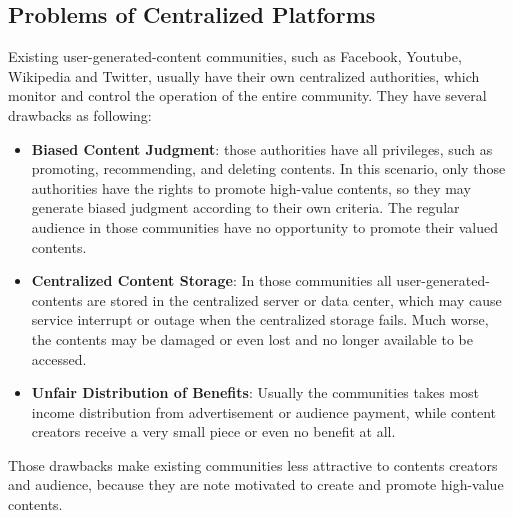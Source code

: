 \subsection{Problems of Centralized Platforms}
Existing user-generated-content communities, such as Facebook, Youtube, Wikipedia and Twitter, usually have their own centralized authorities, which monitor and control the operation of the entire community. They have several drawbacks as following:

\begin{itemize}
\item \textbf{Biased Content Judgment}: those authorities have all privileges, such as promoting, recommending, and deleting contents. In this scenario, only those authorities have the rights to promote high-value contents, so they may generate biased judgment according to their own criteria. The regular audience in those communities have no opportunity to promote their valued contents.

\item \textbf{Centralized Content Storage}: In those communities all user-generated-contents are stored in the centralized server or data center, which may cause service interrupt or outage when the centralized storage fails.  Much worse, the contents may be damaged or even lost and no longer available to be accessed. 

\item \textbf{Unfair Distribution of Benefits}: Usually the communities takes most income distribution from advertisement or audience payment, while content creators receive a very small piece or even no benefit at all.  

\end{itemize}
Those drawbacks make existing communities less attractive to contents creators and audience, because they are note motivated to create and promote high-value contents. 


